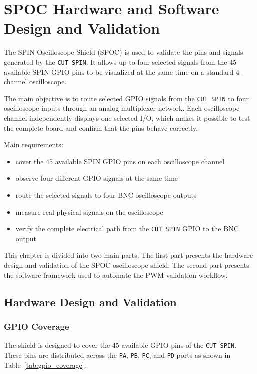 \chapter{SPOC Hardware and Software Design and Validation}



The SPIN Oscilloscope Shield (SPOC) is used to validate the pins
and signals generated by the \texttt{CUT SPIN}. It
allows up to four selected signals from the 45 available SPIN GPIO pins
to be visualized at the same time on a standard 4-channel oscilloscope.

The main objective is to route selected GPIO signals from the
\texttt{CUT SPIN} to four oscilloscope inputs through
an analog multiplexer network. Each oscilloscope channel independently
displays one selected I/O, which makes it possible to test the complete
board and confirm that the pins behave correctly.

Main requirements:

\begin{itemize}
\item
  cover the 45 available SPIN GPIO pins on each oscilloscope channel
\item
  observe four different GPIO signals at the same time
\item
  route the selected signals to four BNC oscilloscope outputs
\item
  measure real physical signals on the oscilloscope
\item
  verify the complete electrical path from the
  \texttt{CUT SPIN} GPIO to the BNC output
\end{itemize}

This chapter is divided into two main parts. The first part presents the
hardware design and validation of the SPOC oscilloscope shield. The
second part presents the software framework used to automate the PWM
validation workflow.



\newpage
\section{Hardware Design and Validation}

\subsection{GPIO Coverage}\label{gpio-coverage}

The shield is designed to cover the 45 available GPIO pins of the
\texttt{CUT SPIN}. These pins are distributed across the \texttt{PA},
\texttt{PB}, \texttt{PC}, and \texttt{PD} ports as shown in
Table~\ref{tab:gpio_coverage}.

